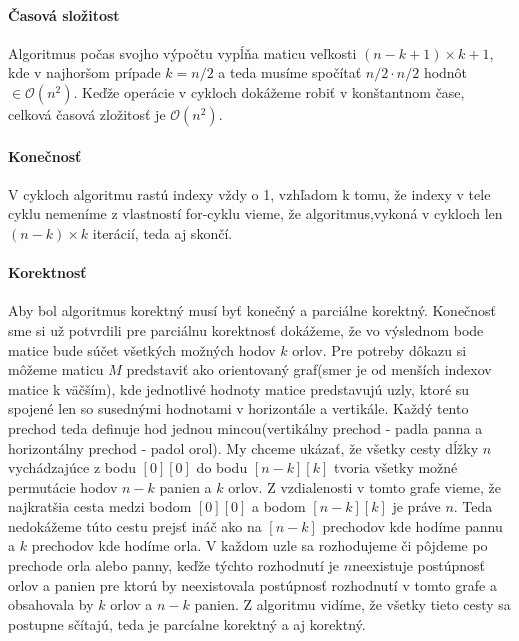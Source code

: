 \documentclass[12pt]{iv003}
\begin{document}
\paragraph{Časová složitost}
Algoritmus počas svojho výpočtu vypĺňa maticu veľkosti $(n-k+1) \times k + 1$, kde v najhoršom prípade $k = n/2$ a teda musíme spočítať $n/2 \cdot n/2$ hodnôt $\in \mathcal{O}(n^{2})$. Keďže operácie v cykloch dokážeme robiť v konštantnom čase, celková časová zložitosť je $\mathcal{O}(n^{2})$.

\paragraph{Konečnosť}V cykloch algoritmu rastú indexy vždy o 1, vzhľadom k tomu, že indexy v tele cyklu nemeníme z vlastností for-cyklu vieme, že algoritmus,vykoná v cykloch len $(n-k) \times k$ iterácií, teda aj skončí.

\paragraph{Korektnosť} Aby bol algoritmus korektný musí byť konečný a parciálne korektný. Konečnosť sme si už potvrdili pre parciálnu korektnosť dokážeme, že vo výslednom bode matice bude súčet všetkých možných hodov $k$ orlov. Pre potreby dôkazu si môžeme maticu $M$ predstaviť ako orientovaný graf(smer je od menších indexov matice k väčším), kde jednotlivé hodnoty matice predstavujú uzly, ktoré su spojené len so susednými hodnotami v horizontále a vertikále. Každý tento prechod teda definuje hod jednou mincou(vertikálny prechod - padla panna a horizontálny prechod - padol orol). My chceme ukázať, že všetky cesty dĺžky $n$ vychádzajúce z bodu $[0][0]$ do bodu $[n-k][k]$ tvoria všetky možné permutácie hodov $n-k$ panien a $k$ orlov. Z vzdialenosti v tomto grafe vieme, že najkratšia cesta medzi bodom $[0][0]$ a bodom $[n-k][k]$ je práve $n$. Teda nedokážeme túto cestu prejsť ináč ako na $[n-k]$ prechodov kde hodíme pannu a $k$ prechodov kde hodíme orla. V každom uzle sa rozhodujeme či pôjdeme po prechode orla alebo panny, keďže týchto rozhodnutí je $n$neexistuje postúpnosť orlov a panien pre ktorú by neexistovala postúpnosť rozhodnutí v tomto grafe a obsahovala by $k$ orlov a $n-k$ panien. Z algoritmu vidíme, že všetky tieto cesty sa postupne sčítajú, teda je parcíalne korektný a aj korektný.
\end{document}
